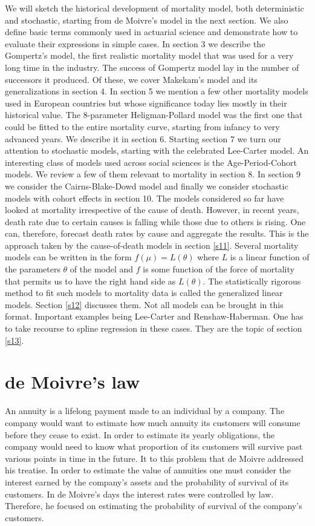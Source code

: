 \documentclass{article}
\numberwithin{equation}{section}
\begin{document}
We will sketch the historical development of mortality model, both 
deterministic and stochastic, starting from de Moivre's model in the next
section. We also define basic terms commonly used in actuarial science and 
demonstrate how to evaluate their expressions in simple cases. In section 3
we describe the Gompertz's model, the first realistic mortality model that 
was used for a very long time in the industry. The success of Gompertz model
lay in the number of successors it produced. Of these, we cover Makekam's 
model and its generalizations in section 4. In section 5 we mention a few
other mortality models used in European countries but whose significance today
lies mostly in their historical value. The $8$-parameter Heligman-Pollard model
was the first one that could be fitted to the entire mortality curve, starting
from infancy to very advanced years. We describe it in section 6. Starting
section 7 we turn our attention to stochastic models, starting with the
celebrated Lee-Carter model. An interesting class of models used across social
sciences is the Age-Period-Cohort models. We review a few of them relevant
to mortality in section 8. In section 9 we consider the Cairns-Blake-Dowd model
and finally we consider stochastic models with cohort effects in section 10. 
The models considered so far have looked at mortality irrespective of the
cause of death. However, in recent years, death rate due to certain causes
is falling while those due to others is rising. One can, therefore, forecast
death rates by cause and aggregate the results. This is the approach taken by
the cause-of-death models in section \ref{s11}. Several mortality models can
be written in the form $f(\mu) = L(\theta)$ where $L$ is a linear function of
the parameters $\theta$ of the model and $f$ is some function of the force
of mortality that permits us to have the right hand side as $L(\theta)$. The
statistically rigorous method to fit such models to mortality data is called
the generalized linear models. Section \ref{s12} discusses them. Not all
models can be brought in this format. Important examples being Lee-Carter and
Renshaw-Haberman. One has to take recourse to spline regression in these
cases. They are the topic of section \ref{s13}.

\section{de Moivre's law}\label{s1}
An annuity is a lifelong payment made to an individual by a company. The 
company would want to estimate how much annuity its customers will consume
before they cease to exist. In order to estimate its yearly obligations, the
company would need to know what proportion of its customers will survive
past various points in time in the future. It to this problem that de Moivre 
\cite{de1731annuities} addressed his treatise. In order to estimate the value
of annuities one must consider the interest earned by the company's assets and
the probability of survival of its customers. In de Moivre's days the interest
rates were controlled by law. Therefore, he focused on estimating the 
probability of survival of the company's customers.
\end{document}
